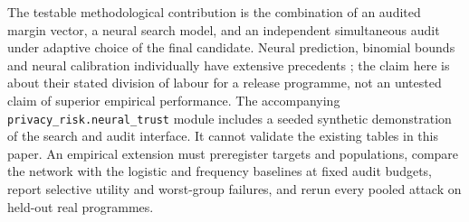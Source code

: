 The testable methodological contribution is the combination of an audited
margin vector, a neural search model, and an independent simultaneous audit
under adaptive choice of the final candidate. Neural prediction, binomial
bounds and neural calibration individually have extensive precedents
\citep{bates2021,guo2017}; the
claim here is about their stated division of labour for a release programme,
not an untested claim of superior empirical performance. The accompanying
\texttt{privacy\_risk.neural\_trust} module includes a seeded synthetic demonstration of the search
and audit interface. It cannot validate the existing tables in this paper.
An empirical extension must preregister targets and populations, compare the
network with the logistic and frequency baselines at fixed audit budgets,
report selective utility and worst-group failures, and rerun every pooled
attack on held-out real programmes.
